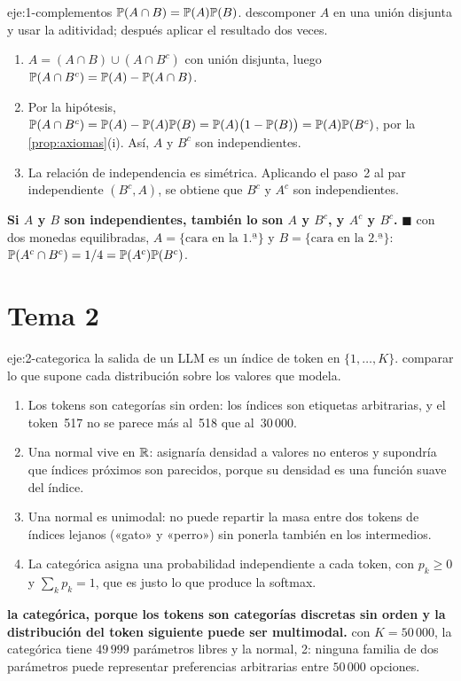 \begin{solucion}{eje:1-complementos}
\datos $\mathbb{P}(A\cap B)=\mathbb{P}(A)\mathbb{P}(B)$.
\planteamiento descomponer $A$ en una unión disjunta y usar la aditividad; después aplicar el resultado dos veces.
\pasos
\begin{enumerate}[label=\arabic*.]
  \item $A=(A\cap B)\cup(A\cap B^{c})$ con unión disjunta, luego $\mathbb{P}(A\cap B^{c})=\mathbb{P}(A)-\mathbb{P}(A\cap B)$.
  \item Por la hipótesis, $\mathbb{P}(A\cap B^{c})=\mathbb{P}(A)-\mathbb{P}(A)\mathbb{P}(B)=\mathbb{P}(A)\bigl(1-\mathbb{P}(B)\bigr)=\mathbb{P}(A)\mathbb{P}(B^{c})$, por la \cref{prop:axiomas}(i). Así, $A$ y $B^{c}$ son independientes.
  \item La relación de independencia es simétrica. Aplicando el paso~2 al par independiente $(B^{c},A)$, se obtiene que $B^{c}$ y $A^{c}$ son independientes.
\end{enumerate}
\resultado \textbf{Si $A$ y $B$ son independientes, también lo son $A$ y $B^{c}$, y $A^{c}$ y $B^{c}$.} $\blacksquare$
\comprobacion con dos monedas equilibradas, $A=\{\text{cara en la 1.ª}\}$ y $B=\{\text{cara en la 2.ª}\}$: $\mathbb{P}(A^{c}\cap B^{c})=1/4=\mathbb{P}(A^{c})\mathbb{P}(B^{c})$.
\end{solucion}

\section{Tema 2}

\begin{solucion}{eje:2-categorica}
\datos la salida de un LLM es un índice de token en $\{1,\dots,K\}$.
\planteamiento comparar lo que supone cada distribución sobre los valores que modela.
\pasos
\begin{enumerate}[label=\arabic*.]
  \item Los tokens son categorías sin orden: los índices son etiquetas arbitrarias, y el token~517 no se parece más al~518 que al~30\,000.
  \item Una normal vive en $\mathbb{R}$: asignaría densidad a valores no enteros y supondría que índices próximos son parecidos, porque su densidad es una función suave del índice.
  \item Una normal es unimodal: no puede repartir la masa entre dos tokens de índices lejanos («gato» y «perro») sin ponerla también en los intermedios.
  \item La categórica asigna una probabilidad independiente a cada token, con $p_k\ge 0$ y $\sum_k p_k=1$, que es justo lo que produce la softmax.
\end{enumerate}
\resultado \textbf{la categórica, porque los tokens son categorías discretas sin orden y la distribución del token siguiente puede ser multimodal.}
\comprobacion con $K=50\,000$, la categórica tiene $49\,999$ parámetros libres y la normal, 2: ninguna familia de dos parámetros puede representar preferencias arbitrarias entre $50\,000$ opciones.
\end{solucion}

